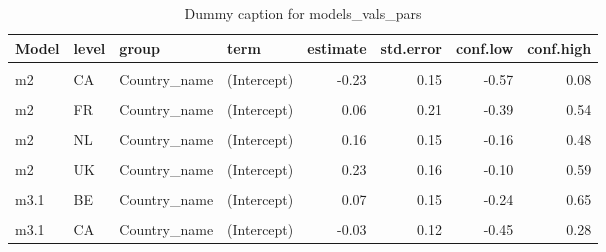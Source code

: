 \begin{table}
\centering
\caption{Dummy caption for models_vals_pars}
\centering
\fontsize{10}{12}\selectfont
\begin{tabular}[t]{llllrrrr}
\toprule
Model & level & group & term & estimate & std.error & conf.low & conf.high\\
\midrule
\cellcolor{gray!10}{m2} & \cellcolor{gray!10}{BE} & \cellcolor{gray!10}{Country\_name} & \cellcolor{gray!10}{(Intercept)} & \cellcolor{gray!10}{0.51} & \cellcolor{gray!10}{0.15} & \cellcolor{gray!10}{0.19} & \cellcolor{gray!10}{0.85}\\
m2 & CA & Country\_name & (Intercept) & -0.23 & 0.15 & -0.57 & 0.08\\
\cellcolor{gray!10}{m2} & \cellcolor{gray!10}{CH} & \cellcolor{gray!10}{Country\_name} & \cellcolor{gray!10}{(Intercept)} & \cellcolor{gray!10}{-0.02} & \cellcolor{gray!10}{0.20} & \cellcolor{gray!10}{-0.43} & \cellcolor{gray!10}{0.40}\\
m2 & FR & Country\_name & (Intercept) & 0.06 & 0.21 & -0.39 & 0.54\\
\cellcolor{gray!10}{m2} & \cellcolor{gray!10}{IL} & \cellcolor{gray!10}{Country\_name} & \cellcolor{gray!10}{(Intercept)} & \cellcolor{gray!10}{-0.08} & \cellcolor{gray!10}{0.34} & \cellcolor{gray!10}{-0.84} & \cellcolor{gray!10}{0.65}\\
m2 & NL & Country\_name & (Intercept) & 0.16 & 0.15 & -0.16 & 0.48\\
\cellcolor{gray!10}{m2} & \cellcolor{gray!10}{SE} & \cellcolor{gray!10}{Country\_name} & \cellcolor{gray!10}{(Intercept)} & \cellcolor{gray!10}{-0.55} & \cellcolor{gray!10}{0.17} & \cellcolor{gray!10}{-0.94} & \cellcolor{gray!10}{-0.20}\\
m2 & UK & Country\_name & (Intercept) & 0.23 & 0.16 & -0.10 & 0.59\\
\cellcolor{gray!10}{m2} & \cellcolor{gray!10}{US} & \cellcolor{gray!10}{Country\_name} & \cellcolor{gray!10}{(Intercept)} & \cellcolor{gray!10}{-0.05} & \cellcolor{gray!10}{0.16} & \cellcolor{gray!10}{-0.40} & \cellcolor{gray!10}{0.30}\\
m3.1 & BE & Country\_name & (Intercept) & 0.07 & 0.15 & -0.24 & 0.65\\
\cellcolor{gray!10}{m3.1} & \cellcolor{gray!10}{BE} & \cellcolor{gray!10}{Country\_name} & \cellcolor{gray!10}{EPS} & \cellcolor{gray!10}{0.13} & \cellcolor{gray!10}{0.07} & \cellcolor{gray!10}{-0.04} & \cellcolor{gray!10}{0.30}\\
m3.1 & CA & Country\_name & (Intercept) & -0.03 & 0.12 & -0.45 & 0.28\\

\end{tabular}
\end{table}
